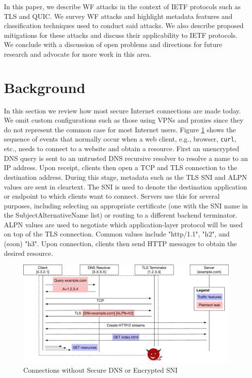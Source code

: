 \documentclass[runningheads]{llncs}
\begin{document}
In this paper, we describe WF attacks in the context of IETF protocols such as TLS and
QUIC. We survey WF attacks and highlight metadata features and classification techniques
used to conduct said attacks. We also describe proposed mitigations for these attacks
and discuss their applicability to IETF protocols. We conclude with a discussion of open
problems and directions for future research and advocate for more work in this area.


\section{Background}
In this section we review how most secure Internet connections are made today. We omit custom
configurations such as those using VPNs and proxies since they do not represent the common case
for most Internet users. Figure \ref{fig:connections-then} shows the sequence of events that
normally occur when a web client, e.g., browser, {\tt curl}, etc., needs to connect to a website
and obtain a resource. First an unencrypted DNS query is sent to an untrusted DNS recursive
resolver to resolve a name to an IP address. Upon receipt, clients then open a TCP and TLS
connection to the destination address. During this stage, metadata such as the TLS SNI and ALPN
values are sent in cleartext. The SNI is used to denote the destination application or endpoint
to which clients want to connect. Servers use this for several purposes, including selecting
an appropriate certificate (one with the SNI name in the SubjectAlternativeName list) or
routing to a different backend terminator. ALPN values are used to negotiate which application-layer
protocol will be used on top of the TLS connection. Common values include "http/1.1", "h2", and
(soon) "h3". Upon connection, clients then send HTTP messages to obtain the desired resource.

\begin{figure}
\includegraphics[scale=0.35]{figures/connection_flow}
\caption{Connections without Secure DNS or Encrypted SNI}
\label{fig:connections-then}
\end{figure}
\end{document}
